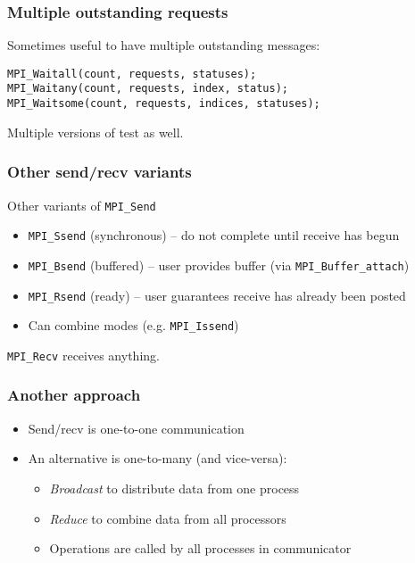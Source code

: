 \documentclass{beamer}
\begin{document}
\begin{frame}[fragile]
  \frametitle{Multiple outstanding requests}

  Sometimes useful to have multiple outstanding messages:
\begin{verbatim}
MPI_Waitall(count, requests, statuses);
MPI_Waitany(count, requests, index, status);
MPI_Waitsome(count, requests, indices, statuses);
\end{verbatim}
  Multiple versions of test as well.

\end{frame}


\begin{frame}
  \frametitle{Other send/recv variants}

  Other variants of {\tt MPI\_Send}
  \begin{itemize}
  \item {\tt MPI\_Ssend} (synchronous) -- do not complete until
    receive has begun
  \item {\tt MPI\_Bsend} (buffered) -- user provides buffer 
    (via {\tt MPI\_Buffer\_attach})
  \item {\tt MPI\_Rsend} (ready) -- user guarantees receive has
    already been posted
  \item Can combine modes (e.g. {\tt MPI\_Issend})
  \end{itemize}
  {\tt MPI\_Recv} receives anything.

\end{frame}


\begin{frame}
  \frametitle{Another approach}

  \begin{itemize}
  \item Send/recv is one-to-one communication
  \item An alternative is one-to-many (and vice-versa):
    \begin{itemize}
    \item {\em Broadcast} to distribute data from one process
    \item {\em Reduce} to combine data from all processors
    \item Operations are called by all processes in communicator
    \end{itemize}
  \end{itemize}
\end{frame}
\end{document}
